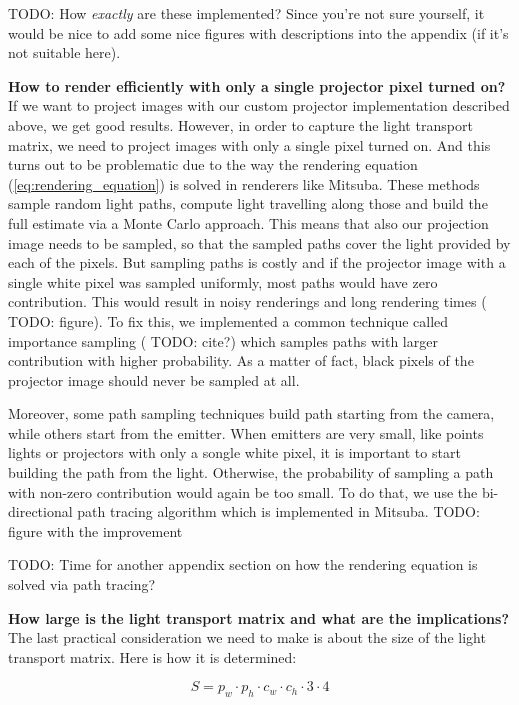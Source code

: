 {\color{red} TODO: How \textit{exactly} are these implemented? Since you're not sure yourself, it would be nice to add some nice figures with descriptions into the appendix (if it's not suitable here).}

\textbf{How to render efficiently with only a single projector pixel turned on?} If we want to project images with our custom projector implementation described above, we get good results. However, in order to capture the light transport matrix, we need to project images with only a single pixel turned on. And this turns out to be problematic due to the way the rendering equation (\ref{eq:rendering_equation}) is solved in renderers like Mitsuba. These methods sample random light paths, compute light travelling along those and build the full estimate via a Monte Carlo approach. This means that also our projection image needs to be sampled, so that the sampled paths cover the light provided by each of the pixels. But sampling paths is costly and if the projector image with a single white pixel was sampled uniformly, most paths would have zero contribution. This would result in noisy renderings and long rendering times ({\color{red} TODO: figure}). To fix this, we implemented a common technique called importance sampling ({\color{red} TODO: cite?}) which samples paths with larger contribution with higher probability. As a matter of fact, black pixels of the projector image should never be sampled at all.

Moreover, some path sampling techniques build path starting from the camera, while others start from the emitter. When emitters are very small, like points lights or projectors with only a songle white pixel, it is important to start building the path from the light. Otherwise, the probability of sampling a path with non-zero contribution would again be too small. To do that, we use the bi-directional path tracing algorithm which is implemented in Mitsuba. {\color{red} TODO: figure with the improvement}

{\color{red} TODO: Time for another appendix section on how the rendering equation is solved via path tracing?}

\textbf{How large is the light transport matrix and what are the implications?} The last practical consideration we need to make is about the size of the light transport matrix. Here is how it is determined:

\begin{equation}
    \label{eq:lt_matrix_size}
    S = p_w \cdot p_h \cdot c_w \cdot c_h \cdot 3 \cdot 4
\end{equation}

